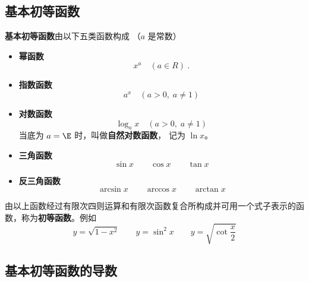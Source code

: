 

\subsection{基本初等函数}
\textbf{基本初等函数}由以下五类函数构成 （$a$ 是常数）

\begin{itemize}
\item \textbf{幂函数}
\begin{equation}\label{eq_FunDer_3}
x^a \quad(a \in R)~.
\end{equation}
\item \textbf{指数函数}
\begin{equation}
a^x \quad(a > 0, \; a \ne 1)
\end{equation}
\item \textbf{对数函数}
\begin{equation}
\log_a x \quad(a > 0, \; a \ne 1)
\end{equation}
当底为 $a = \E$ 时，叫做\textbf{自然对数函数}， 记为 $\ln x$。
\item \textbf{三角函数}
\begin{equation}
\sin x \qquad  \cos x \qquad \tan x
\end{equation}
\item \textbf{反三角函数}
\begin{equation}
\arcsin x  \qquad \arccos x  \qquad \arctan x
\end{equation}
\end{itemize}

由以上函数经过有限次四则运算和有限次函数复合所构成并可用一个式子表示的函数，称为\textbf{初等函数}。例如
\begin{equation}
y = \sqrt{1 - x^2}\qquad y = \sin ^2 x\qquad y = \sqrt{\cot \frac{x}{2}} 
\end{equation}

\subsection{基本初等函数的导数}

